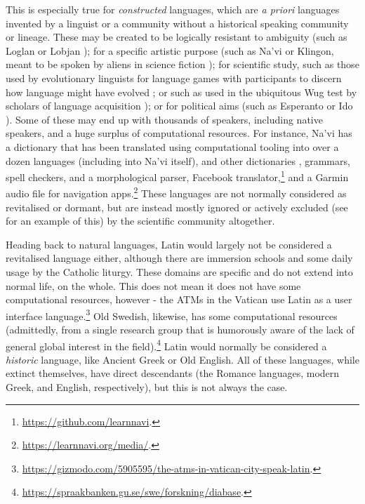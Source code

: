 This is especially true for \textit{constructed} languages, which are \textit{a priori} languages invented by a linguist or a community without a historical speaking community or lineage. These may be created to be logically resistant to ambiguity (such as Loglan or Lobjan \citep{okrent2009land}); for a specific artistic purpose (such as Na'vi or Klingon, meant to be spoken by aliens in science fiction \citep{schreyer2015digital, schreyer2011media}); for scientific study, such as those used by evolutionary linguists for language games with participants to discern how language might have evolved \citep{scott2010language}; or such as used in the ubiquitous Wug test by scholars of language acquisition \citep{ratner2000beginning}); or for political aims (such as Esperanto or Ido \citep{okrent2009land}). Some of these may end up with thousands of speakers, including native speakers, and a huge surplus of computational resources. For instance, Na'vi has a dictionary \citep{navidictionary} that has been translated using computational tooling into over a dozen languages (including into Na'vi itself), and other dictionaries \citep{wmannis}, grammars, spell checkers, and a morphological parser, Facebook translator,\footnote{\href{https://github.com/learnnavi}{https://github.com/learnnavi}. } and a Garmin audio file for navigation apps.\footnote{\href{https://learnnavi.org/media/}{https://learnnavi.org/media/}. } These languages are not normally considered as revitalised or dormant, but are instead mostly ignored or actively excluded (see \citet{gibson2016assessing} for an example of this) by the scientific community altogether.

Heading back to natural languages, Latin would largely not be considered a revitalised language either, although there are immersion schools and some daily usage by the Catholic liturgy. These domains are specific and do not extend into normal life, on the whole. This does not mean it does not have some computational resources, however - the ATMs in the Vatican use Latin as a user interface language.\footnote{\href{https://gizmodo.com/5905595/the-atms-in-vatican-city-speak-latin}{https://gizmodo.com/5905595/the-atms-in-vatican-city-speak-latin}. } Old Swedish, likewise, has some computational resources (admittedly, from a single research group that is humorously aware of the lack of general global interest in the field).\footnote{\href{https://spraakbanken.gu.se/swe/forskning/diabase}{https://spraakbanken.gu.se/swe/forskning/diabase}. } Latin would normally be considered a \textit{historic} language, like Ancient Greek or Old English. All of these languages, while extinct themselves, have direct descendants (the Romance languages, modern Greek, and English, respectively), but this is not always the case.

